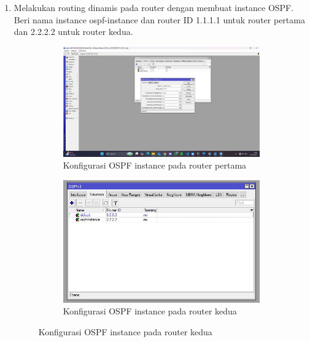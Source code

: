\begin{enumerate}
\begin{figure}[H]
\begin{subfigure}[b]{0.4\linewidth}
			\caption{Konfigurasi ether1 dan ether4 router kedua\label{fig:konfigurasiR2}}
		\end{subfigure}
		\caption{Konfigurasi IP address pada router}
		\hspace{1cm}
	\end{figure}
	\item Melakukan routing dinamis pada router dengan membuat instance OSPF. Beri nama instance ospf-instance dan router ID 1.1.1.1 untuk router pertama dan 2.2.2.2 untuk router kedua.
	\begin{figure}[H]
		\centering
		\begin{subfigure}[b]{0.4\linewidth}
			\centering
			\includegraphics[width=\linewidth]{P2/img/router 1 laptop 1 (7).jpg}
			\caption{Konfigurasi OSPF instance pada router pertama\label{fig:konfigurasiR1}}
		\end{subfigure}
		\begin{subfigure}[b]{0.4\linewidth}
			\centering
			\includegraphics[width=\linewidth]{P2/img/router2 laptop2 (5).jpg}
			\caption{Konfigurasi OSPF instance pada router kedua\label{fig:konfigurasiR2}}

\end{subfigure}
\end{figure}
\end{enumerate}
